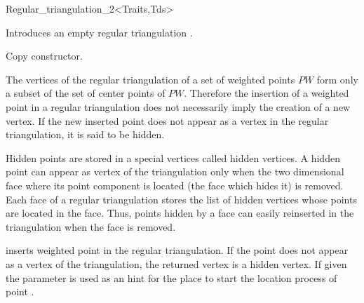 \begin{ccRefClass}{Regular_triangulation_2<Traits,Tds>}

\ccInheritsFrom
{}

\ccTypes
{}
\ccThreeToTwo
{}

\ccGlue
{}
\ccGlue
{}
\ccGlue
{}



\ccCreation
{}  %

{Introduces an empty regular triangulation \ccVar.}

{Copy constructor.}



The vertices of the regular triangulation
of a set of weighted points ${  PW}$ form only a subset
of the set of center points of ${   PW}$.
Therefore the  insertion of a weighted point  in a regular triangulation
does not necessarily imply the creation of a new vertex.
If the new inserted point does not appear as a vertex in the
regular triangulation, it is said to be hidden. 

Hidden points
are  stored in a special vertices called hidden vertices.
A hidden point can appear as vertex of the triangulation
only when the
two dimensional face where its point component is located
(the face which hides it)
is removed.
Each  face of a regular triangulation stores
the list of hidden vertices whose points are located in the face.
Thus,  points hidden by a face can easily reinserted in the triangulation
when the face is removed.



{inserts  weighted point  in the regular triangulation.
If the point   does not appear as a vertex of the triangulation,
the returned vertex is  a hidden vertex.
If given the parameter  is used as an hint
for the place to start the location process of point .}



\end{ccRefClass}
